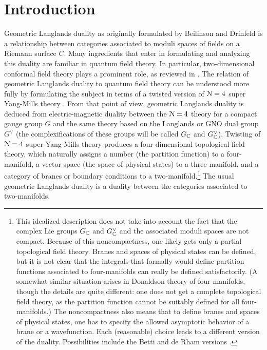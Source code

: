 \documentclass[11pt,a4paper]{article}
\begin{document}
\tableofcontents


\section{Introduction}\label{intro}


Geometric Langlands duality as originally formulated by Beilinson and Drinfeld \cite{BD} is a relationship
between categories associated to moduli spaces of fields on a Riemann surface $C$.
 Many ingredients that enter in formulating and analyzing this
duality  are familiar in quantum field theory.   In particular, two-dimensional conformal field theory plays a prominent role, as reviewed in \cite{F}.
The relation of geometric Langlands duality to quantum field theory can be understood more fully by formulating the subject
in terms of a twisted version of ${\mathcal N}=4$ super Yang-Mills theory \cite{KW}.  From that point of view, geometric Langlands duality is
deduced from electric-magnetic duality between the ${\mathcal N}=4$ theory for a compact gauge group $G$
and the same theory based on the Langlands or GNO dual group $G^\vee$ (the complexifications of these groups will be called $G_{\mathbb C}$ and $G^\vee_{\mathbb C}$).  
Twisting of ${\mathcal N}=4$ super Yang-Mills
theory produces a  four-dimensional topological field theory, which naturally \cite{BaDo,L1,Fr} assigns a number (the partition function) to a four-manifold,
a vector space (the space of physical states) to a three-manifold, and a category of branes or boundary conditions to a two-manifold.\footnote{\label{partial}
This idealized description
does not take into account the fact that the complex Lie groups $G_{\mathbb C}$ and $G^\vee_{\mathbb C}$ and the associated moduli spaces are not compact.   
Because of this noncompactness, one likely gets only  a partial topological field theory. 
Branes and spaces of physical states can be defined, but 
it is not clear that the integrals that formally would define partition functions associated
to four-manifolds can really be defined satisfactorily. (A somewhat similar situation arises in Donaldson theory of four-manifolds, though the
details are quite different: one does not get a complete topological field theory, as the partition function cannot be suitably defined for all four-manifolds.)  
The noncompactness also means that to define branes and spaces of physical states, 
one has to specify the allowed asymptotic behavior of a brane or a wavefunction.  Each (reasonable) choice leads to a different version of the duality. 
Possibilities include the Betti and de Rham versions  \cite{BN}.}   
The usual geometric Langlands duality is a duality between the categories associated to two-manifolds. 
\end{document}
